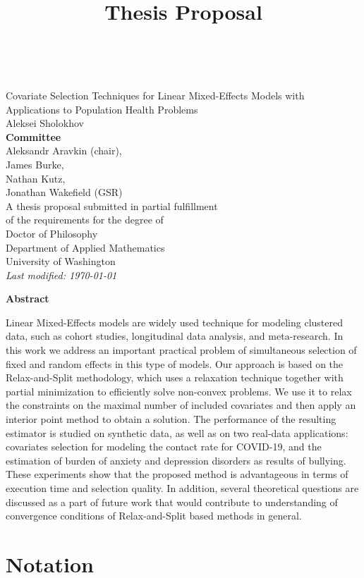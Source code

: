 \documentclass[11pt,letterpaper]{article}
\newcommand{\userName}{Aleksei Sholokhov}
\newcommand{\department}{Department of Applied Mathematics}
\newcommand{\institution}{University of Washington}
\newcommand{\doctitle}{Thesis Proposal}
\numberwithin{equation}{section} %
\numberwithin{figure}{section} %
\numberwithin{table}{section} %
\begin{document}
\title{\doctitle}
~\\
{\center
{\large 
{\huge
Covariate Selection Techniques for Linear Mixed-Effects Models with Applications to Population Health Problems }
\\[10mm]
\userName
\\[40mm]
{\center
\textbf{Committee}\\
Aleksandr Aravkin (chair),\\
James Burke, \\
Nathan Kutz, \\
Jonathan Wakefield (GSR)
}
\\[40mm]
{A thesis proposal submitted in partial fulfillment\\ of the requirements for the degree of}
\\[5mm]
{Doctor of Philosophy}
\\[15mm]
\department
\\[5mm]
\institution
}
\\[10mm]
\textit{Last modified: \today}

}  

\newpage
{\center \textbf{Abstract}\\[5mm]}

Linear Mixed-Effects models are widely used technique for modeling clustered data, such as cohort studies, longitudinal data analysis, and meta-research. In this work we address an important practical problem of simultaneous selection of fixed and random effects in this type of models. Our approach is based on the Relax-and-Split methodology, which uses a relaxation technique together with partial minimization to efficiently solve non-convex problems. We use it to relax the constraints on the maximal number of included covariates and then apply an interior point method to obtain a solution. The performance of the resulting estimator is studied on synthetic data, as well as on two real-data applications: covariates selection for modeling the contact rate for COVID-19, and the estimation of burden of anxiety and depression disorders as results of bullying. These experiments show that the proposed method is advantageous in terms of execution time and selection quality. In addition, several theoretical questions are discussed as a part of future work that would contribute to understanding of convergence conditions of Relax-and-Split based methods in general.


\newpage
\tableofcontents

\newpage
\section*{Notation}
\end{document}
